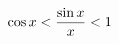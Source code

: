 \documentclass[preview]{standalone}
\begin{document}
\begin{align*}
\special{dvisvgm:raw <g id='unique000'>}\cos x < \frac{\sin x}{x} < 1\special{dvisvgm:raw </g>}
\end{align*}
\end{document}
